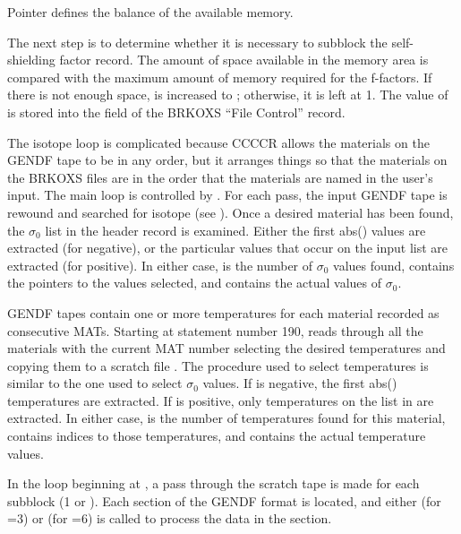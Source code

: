 \noindent
Pointer  defines the balance of the available memory.

The next step is to determine whether it is necessary to subblock
the self-shielding factor record.  The amount of space available
in the memory area is compared with the maximum amount of memory
required for the f-factors.  If there is not enough space,
 is increased to ; otherwise, it is
left at 1.  The value of  is stored into the 
field of the BRKOXS ``File Control'' record.

The isotope loop is complicated because CCCCR allows the materials
on the GENDF tape to be in any order, but it arranges things so that the
materials on the BRKOXS files are in the order that the materials are
named in the user's input.  The main loop is controlled by
.  For each pass, the input GENDF tape is rewound
and searched for isotope  (see ).  Once
a desired material has been found, the $\sigma_0$ list in the header
record is examined.  Either the first abs() values are
extracted (for  negative), or the particular values that
occur on the input  list are extracted (for 
positive).  In either case,  is the number of $\sigma_0$
values found,  contains the pointers to the values selected,
and  contains the actual values of $\sigma_0$.

GENDF tapes contain one or more temperatures for each material recorded
as consecutive MATs.  Starting at statement number 190,
 reads through all the
materials with the current MAT number selecting the desired
temperatures and copying them to a scratch file .
The procedure used to select temperatures is similar to the one used to
select $\sigma_0$ values.  If  is negative, the first
abs() temperatures are extracted.  If  is positive,
only temperatures on the list in  are extracted. In either
case,  is the number of temperatures found for this material,
 contains indices to those temperatures, and 
contains the actual temperature values.

In the loop beginning at , a pass through the
scratch tape is made for each subblock (1 or ).  Each
section of the GENDF format is located, and either 
(for =3) or  (for =6) is called to
process the data in the section.

